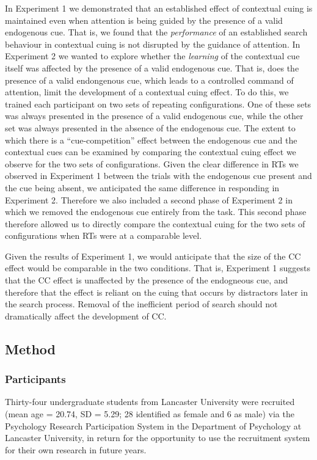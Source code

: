\documentclass[
  man,
  floatsintext,
  longtable,
  nolmodern,
  notxfonts,
  notimes,
  colorlinks=true,linkcolor=blue,citecolor=blue,urlcolor=blue]{apa7}
\begin{document}
In Experiment 1 we demonstrated that an established effect of contextual
cuing is maintained even when attention is being guided by the presence
of a valid endogenous cue. That is, we found that the \emph{performance}
of an established search behaviour in contextual cuing is not disrupted
by the guidance of attention. In Experiment 2 we wanted to explore
whether the \emph{learning} of the contextual cue itself was affected by
the presence of a valid endogenous cue. That is, does the presence of a
valid endongenous cue, which leads to a controlled command of attention,
limit the development of a contextual cuing effect. To do this, we
trained each participant on two sets of repeating configurations. One of
these sets was always presented in the presence of a valid endogenous
cue, while the other set was always presented in the absence of the
endogenous cue. The extent to which there is a ``cue-competition''
effect between the endogenous cue and the contextual cues can be
examined by comparing the contextual cuing effect we observe for the two
sets of configurations. Given the clear difference in RTs we observed in
Experiment 1 between the trials with the endogenous cue present and the
cue being absent, we anticipated the same difference in responding in
Experiment 2. Therefore we also included a second phase of Experiment 2
in which we removed the endogenous cue entirely from the task. This
second phase therefore allowed us to directly compare the contextual
cuing for the two sets of configurations when RTs were at a comparable
level.

Given the results of Experiment 1, we would anticipate that the size of
the CC effect would be comparable in the two conditions. That is,
Experiment 1 suggests that the CC effect is unaffected by the presence
of the endogneous cue, and therefore that the effect is reliant on the
cuing that occurs by distractors later in the search process. Removal of
the inefficient period of search should not dramatically affect the
development of CC.

\subsection{Method}\label{method-1}

\subsubsection{Participants}\label{participants-1}

Thirty-four undergraduate students from Lancaster University were
recruited (mean age = 20.74, SD = 5.29; 28 identified as female and 6 as
male) via the Psychology Research Participation System in the Department
of Psychology at Lancaster University, in return for the opportunity to
use the recruitment system for their own research in future years.
\end{document}
